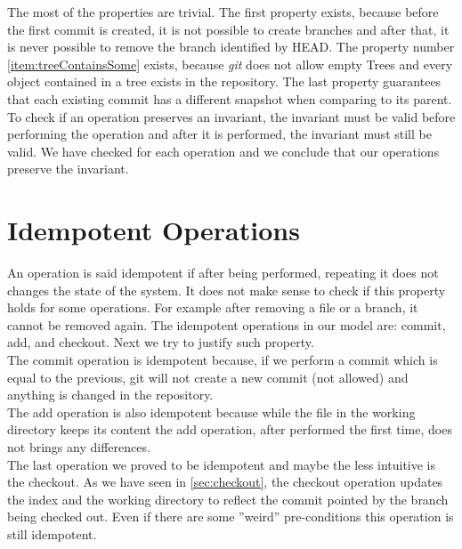 The most of the properties are trivial. The first property exists,
because before the first commit is created, it is not possible to
create branches and after that, it is never possible to remove the branch
identified by HEAD. The property number 
\ref{item:treeContainsSome} exists, because
\emph{git} does not allow empty Trees and every object contained in a
tree exists in the repository. The last property guarantees
that each existing commit has a different snapshot when comparing to
its parent.\\

To check if an operation preserves an invariant, the invariant must be
valid before performing the operation and after it is performed, the
invariant must still be valid. We have checked for each operation and
we conclude that our operations preserve the invariant.


\section{Idempotent Operations}
An operation is said idempotent if after being performed, repeating it
does not changes the state of the system. It does not make sense to
check if this property holds for some operations. For example after
removing a file or a branch, it cannot be removed again. The
idempotent operations in our model are: commit, add, and checkout.
Next we try to justify such property.\\

The commit operation is idempotent because, if we perform a commit which 
is equal to the previous, git will not create a new commit (not
allowed) and anything is changed in the repository.\\

The add operation is also idempotent because while the file in the
working directory keeps its content the add operation, after performed
the first time, does not brings any differences.\\

The last operation we proved to be idempotent and maybe the less
intuitive is the checkout. As we have seen in
\ref{sec:checkout}, the checkout operation updates the index and
the working directory to reflect the commit pointed by the branch being
checked out. Even if there are some ''weird'' pre-conditions this
operation is still idempotent.

